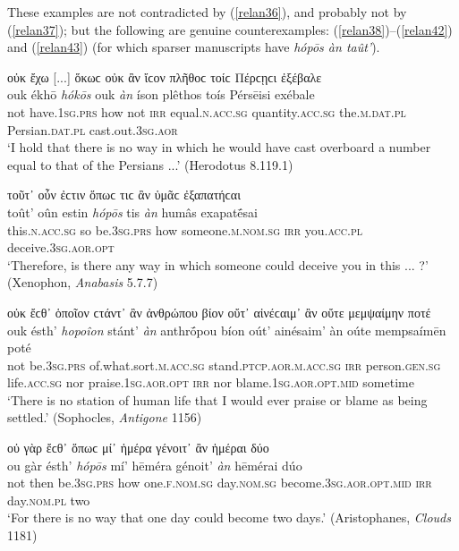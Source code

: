These examples are not contradicted by (\ref{relan36}), and probably not by (\ref{relan37}); but the following are genuine counterexamples: (\ref{relan38})--(\ref{relan42}) and (\ref{relan43}) (for which sparser manuscripts have \emph{hópōs àn taût'}).

\begin{exe}
\ex οὐκ ἔχω {[}...{]} ὅκωϲ οὐκ ἂν ἴϲον πλῆθοϲ τοίϲ Πέρϲῃϲι ἐξέβαλε\\
\gll ouk ékhō \emph{hókōs} ouk \emph{àn} íson plêthos toís Pérsēisi exébale\\
not have.\textsc{1sg.prs} how not \textsc{irr} equal.\textsc{n.acc.sg} quantity.\textsc{acc.sg} the.\textsc{m.dat.pl} Persian.\textsc{dat.pl} cast.out.\textsc{3sg.aor}\\
\trans `I hold that there is no way in which he would have cast overboard a number equal to that of the Persians ...' (Herodotus 8.119.1)
\label{relan36}
\end{exe}

\begin{exe}
\ex τοῦτ᾽ οὖν ἐϲτιν ὅπωϲ τιϲ ἂν ὑμᾶϲ ἐξαπατήϲαι\\
\gll toût' oûn estin \emph{hópōs} tis \emph{àn} humâs exapatḗsai\\
this.\textsc{n.acc.sg} so be.\textsc{3sg.prs} how someone.\textsc{m.nom.sg} \textsc{irr} you.\textsc{acc.pl} deceive.\textsc{3sg.aor.opt}\\
\trans `Therefore, is there any way in which someone could deceive you in this ... ?' (Xenophon, \textit{Anabasis} 5.7.7)
\label{relan37}
\end{exe}

\begin{exe}
\ex οὐκ ἔϲθ᾽ ὁποῖον ϲτάντ᾽ ἂν ἀνθρώπου βίον οὔτ᾽ αἰνέϲαιμ᾽ ἂν οὔτε μεμψαίμην ποτέ\\
\gll ouk ésth' \emph{hopoîon} stánt' \emph{àn} anthrṓpou bíon oút' ainésaim' àn oúte mempsaímēn poté\\
not be.\textsc{3sg.prs} of.what.sort.\textsc{m.acc.sg} stand.\textsc{ptcp.aor.m.acc.sg} \textsc{irr} person.\textsc{gen.sg} life.\textsc{acc.sg} nor praise.\textsc{1sg.aor.opt} \textsc{irr} nor blame.\textsc{1sg.aor.opt.mid} sometime\\
\trans `There is no station of human life that I would ever praise or blame as being settled.' (Sophocles, \textit{Antigone} 1156)
\label{relan38}
\end{exe}

\begin{exe}
\ex οὐ γὰρ ἔϲθ᾽ ὅπωϲ μί᾽ ἡμέρα γένοιτ᾽ ἂν ἡμέραι δύο\\
\gll ou gàr ésth' \emph{hópōs} mí' hēméra génoit' \emph{àn} hēmérai dúo\\
not then be.\textsc{3sg.prs} how one.\textsc{f.nom.sg} day.\textsc{nom.sg} become.\textsc{3sg.aor.opt.mid} \textsc{irr} day.\textsc{nom.pl} two\\
\trans `For there is no way that one day could become two days.' (Aristophanes, \textit{Clouds} 1181)
\label{relan39}
\end{exe}

